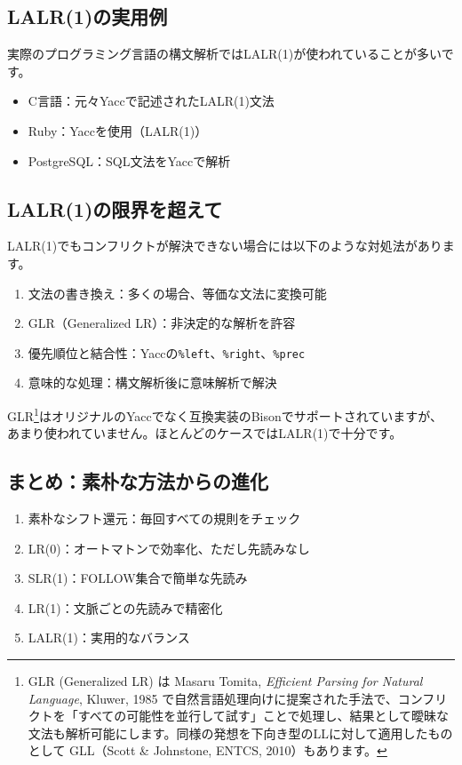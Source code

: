\subsection{LALR(1)の実用例}

実際のプログラミング言語の構文解析ではLALR(1)が使われていることが多いです。

\begin{itemize}
\item
  C言語：元々Yaccで記述されたLALR(1)文法
\item
  Ruby：Yaccを使用（LALR(1)）
\item
  PostgreSQL：SQL文法をYaccで解析
\end{itemize}

\subsection{LALR(1)の限界を超えて}

LALR(1)でもコンフリクトが解決できない場合には以下のような対処法があります。

\begin{enumerate}
\item
  文法の書き換え：多くの場合、等価な文法に変換可能
\item
  GLR（Generalized LR）：非決定的な解析を許容
\item
  優先順位と結合性：Yaccの\texttt{\%left}、\texttt{\%right}、\texttt{\%prec}
\item
  意味的な処理：構文解析後に意味解析で解決
\end{enumerate}

GLR\footnote{GLR (Generalized LR) は Masaru Tomita, \emph{Efficient
  Parsing for Natural Language}, Kluwer, 1985
  で自然言語処理向けに提案された手法で、コンフリクトを「すべての可能性を並行して試す」ことで処理し、結果として曖昧な文法も解析可能にします。同様の発想を下向き型のLLに対して適用したものとして
  GLL（Scott \& Johnstone, ENTCS, 2010）もあります。}はオリジナルのYaccでなく互換実装のBisonでサポートされていますが、あまり使われていません。ほとんどのケースではLALR(1)で十分です。

\subsection{まとめ：素朴な方法からの進化}

\begin{enumerate}
\item
  素朴なシフト還元：毎回すべての規則をチェック
\item
  LR(0)：オートマトンで効率化、ただし先読みなし
\item
  SLR(1)：FOLLOW集合で簡単な先読み
\item
  LR(1)：文脈ごとの先読みで精密化
\item
  LALR(1)：実用的なバランス
\end{enumerate}

